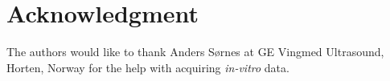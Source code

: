 \documentclass[draftcls]{IEEEtran}
\begin{document}



\section*{Acknowledgment}


The authors would like to thank Anders S\o{}rnes at GE Vingmed Ultrasound, Horten, Norway for the help with acquiring \textit{in-vitro} data.


\ifCLASSOPTIONcaptionsoff
  \newpage
\fi






%

%

\end{document}
